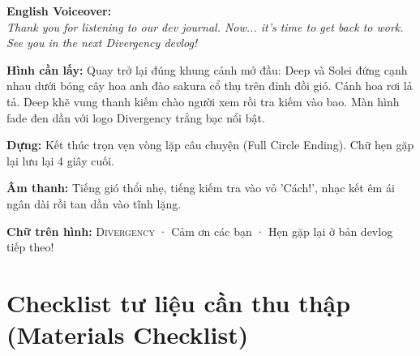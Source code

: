 \documentclass[11pt,a4paper]{article}
\newcommand{\field}[2]{\textbf{\color{divergencynavy}#1:} #2\par\vspace{2pt}}
\newcommand{\voBox}[2]{%
  \vspace{3pt}%
  \noindent\colorbox{codebg}{%
    \parbox{\dimexpr\linewidth-2\fboxsep}{%
      \textbf{\color{divergencynavy}#1:}\\
      \textit{#2}%
    }%
  }\par\vspace{3pt}%
}
\begin{document}
\voBox{English Voiceover}{Thank you for listening to our dev journal. Now... it’s time to get back to work. See you in the next Divergency devlog!}

\field{Hình cần lấy}{Quay trở lại đúng khung cảnh mở đầu: Deep và Solei đứng cạnh nhau dưới bóng cây hoa anh đào sakura cổ thụ trên đỉnh đồi gió. Cánh hoa rơi lả tả. Deep khẽ vung thanh kiếm chào người xem rồi tra kiếm vào bao. Màn hình fade đen dần với logo Divergency trắng bạc nổi bật.}

\field{Dựng}{Kết thúc trọn vẹn vòng lặp câu chuyện (Full Circle Ending). Chữ hẹn gặp lại lưu lại 4 giây cuối.}

\field{Âm thanh}{Tiếng gió thổi nhẹ, tiếng kiếm tra vào vỏ 'Cách!', nhạc kết êm ái ngân dài rồi tan dần vào tĩnh lặng.}

\field{Chữ trên hình}{\textsc{Divergency} · Cảm ơn các bạn · Hẹn gặp lại ở bản devlog tiếp theo!}

\newpage
\section{Checklist tư liệu cần thu thập (Materials Checklist)}
\end{document}
